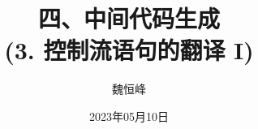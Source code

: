 \documentclass[]{beamer}
\title[中间代码生成]{四、中间代码生成 \\ (3. 控制流语句的翻译 I)}
\author[魏恒峰]{\large 魏恒峰}
\institute{hfwei@nju.edu.cn}
\date{2023年05月10日}
\begin{document}
\maketitle



\thankyou{}

\end{document}
